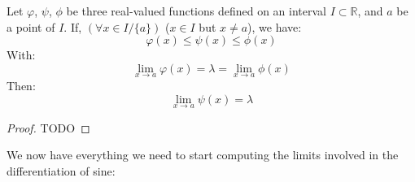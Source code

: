 \documentclass[solutions.tex]{subfiles}
\begin{document}
\begin{theorem} Let $\varphi$, $\psi$, $\phi$ be three
real-valued functions defined on an interval $I\subset\mathbb{R}$, and
$a$ be a point of $I$. If, $(\forall x \in I/\{a\})$ ($x\in I$ but $x\neq a$),
we have:
\[
	\varphi(x) \le \psi(x) \le \phi(x)
\]
With:
\[
	\lim_{x\rightarrow a} \varphi(x) = \lambda = \lim_{x\rightarrow a}\phi(x)
\]
Then:
\[
	\boxed{\lim_{x\rightarrow a}\psi(x) = \lambda}
\]
\end{theorem}
\begin{proof}
TODO
\end{proof}

\hrr

We now have everything we need to start computing the limits involved
in the differentiation of sine:
\end{document}
